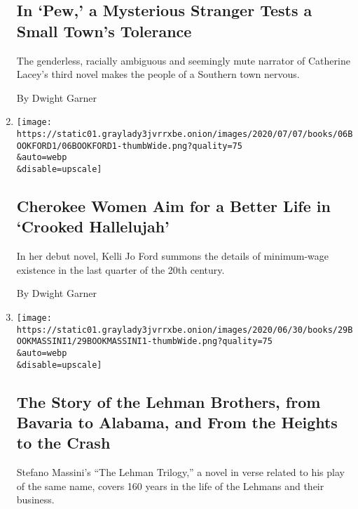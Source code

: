 \begin{enumerate}
  \hypertarget{in-pew-a-mysterious-stranger-tests-a-small-towns-tolerance}{%
  \subsection{In `Pew,' a Mysterious Stranger Tests a Small Town's
  Tolerance}\label{in-pew-a-mysterious-stranger-tests-a-small-towns-tolerance}}

  The genderless, racially ambiguous and seemingly mute narrator of
  Catherine Lacey's third novel makes the people of a Southern town
  nervous.

  By Dwight Garner
\item
  \href{/2020/07/06/books/review-crooked-hallelujah-kelli-jo-ford.html}{}

  \texttt{[image: https://static01.graylady3jvrrxbe.onion/images/2020/07/07/books/06BOOKFORD1/06BOOKFORD1-thumbWide.png?quality=75\\\&auto=webp\\\&disable=upscale]}

  \hypertarget{cherokee-women-aim-for-a-better-life-in-crooked-hallelujah}{%
  \subsection{Cherokee Women Aim for a Better Life in `Crooked
  Hallelujah'}\label{cherokee-women-aim-for-a-better-life-in-crooked-hallelujah}}

  In her debut novel, Kelli Jo Ford summons the details of minimum-wage
  existence in the last quarter of the 20th century.

  By Dwight Garner
\item
  \href{/2020/06/29/books/review-lehman-trilogy-stefano-massini.html}{}

  \texttt{[image: https://static01.graylady3jvrrxbe.onion/images/2020/06/30/books/29BOOKMASSINI1/29BOOKMASSINI1-thumbWide.png?quality=75\\\&auto=webp\\\&disable=upscale]}

  \hypertarget{the-story-of-the-lehman-brothers-from-bavaria-to-alabama-and-from-the-heights-to-the-crash}{%
  \subsection{The Story of the Lehman Brothers, from Bavaria to Alabama,
  and From the Heights to the
  Crash}\label{the-story-of-the-lehman-brothers-from-bavaria-to-alabama-and-from-the-heights-to-the-crash}}

  Stefano Massini's ``The Lehman Trilogy,'' a novel in verse related to
  his play of the same name, covers 160 years in the life of the Lehmans
  and their business.


\end{enumerate}
